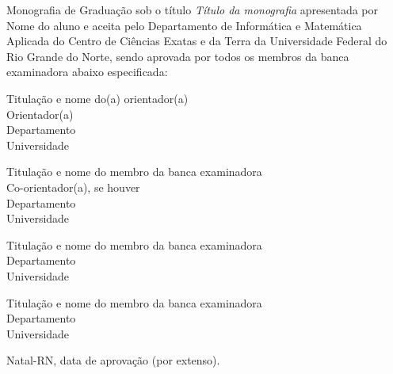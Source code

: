 \begin{folhadeaprovacao}
	\setlength{\ABNTsignthickness}{0.4pt}
	\setlength{\ABNTsignwidth}{10cm}
	
	\noindent 
	Monografia de Graduação sob o título \textit{Título da monografia} apresentada por 
	Nome do aluno e aceita pelo Departamento de Informática e Matemática Aplicada do
	Centro de Ciências Exatas e da Terra da Universidade Federal do Rio Grande do Norte,
	sendo aprovada por todos os membros da banca examinadora abaixo especificada:
		
	\assinatura
	{
		Titulação e nome do(a) orientador(a)\\
		{\small Orientador(a)} 															\\ 
		{\footnotesize
			Departamento 																	\\
		  	Universidade
		}
	}
	
	\assinatura
	{
		Titulação e nome do membro da banca examinadora							\\
		{\small Co-orientador(a), se houver}										\\ 
		{\footnotesize
			Departamento 																	\\
		  	Universidade
		}
	}
		
	\assinatura
	{
		Titulação e nome do membro da banca examinadora 						 \\ 
		{\footnotesize
			Departamento 																	 \\
		  	Universidade
		}
	}
		
	\assinatura
	{
		Titulação e nome do membro da banca examinadora 						 \\ 
		{\footnotesize
			Departamento 																	 \\
		  	Universidade
		}
	}
		
	\vfill
	
	\begin{center}
		Natal-RN, data de aprovação (por extenso).
	\end{center}
\end{folhadeaprovacao}